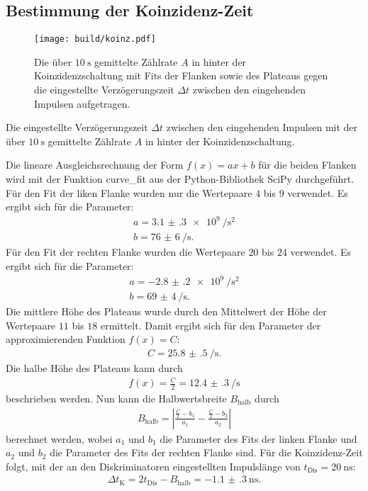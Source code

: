 \subsection{Bestimmung der Koinzidenz-Zeit}
\label{subsec:Koinzidenz}
\begin{figure}
	\centering
	\texttt{[image: build/koinz.pdf]}
	\caption{Die über $\SI{10}{\second}$ gemittelte Zählrate $A$ in hinter der Koinzidenzschaltung mit Fits der Flanken sowie des Plateaus gegen die eingestellte Verzögerungszeit $\varDelta t$ zwischen den eingehenden Impulsen aufgetragen.}
	\label{fig:zweite}
\end{figure}
\begin{table}
	\centering
	\caption{Die eingestellte Verzögerungszeit $\varDelta t$ zwischen den eingehenden Impulsen mit der über $\SI{10}{\second}$ gemittelte Zählrate $A$ in hinter der Koinzidenzschaltung.}
	
\end{table}
Die lineare Ausgleichsrechnung der Form $f(x)=ax +b$ für die beiden Flanken wird mit der Funktion curve\_fit aus der Python-Bibliothek SciPy \cite{scipy} durchgeführt. Für den Fit der liken Flanke wurden nur die Wertepaare $4$ bis $9$ verwendet. Es ergibt sich für die Parameter:
\begin{gather*}
	a=\SI{3.1(3)e9}{\per\second\tothe{2}}\\
	b=\SI{76(6)}{\per\second}.
\end{gather*}
Für den Fit der rechten Flanke wurden die Wertepaare $20$ bis $24$ verwendet. Es ergibt sich für die Parameter:
\begin{gather*}
	a=\SI{-2.8(2)e9}{\per\second\tothe{2}}\\
	b=\SI{69(4)}{\per\second}.
\end{gather*}
Die mittlere Höhe des Plateaus wurde durch den Mittelwert der Höhe der Wertepaare $11$ bis $18$ ermittelt. Damit ergibt sich für den Parameter der approximierenden Funktion $f(x)=C$:
\begin{gather*}
	C=\SI{25.8(5)}{\per\second}.
\end{gather*}
Die halbe Höhe des Plateaus kann durch 
\begin{gather*}
	f(x)=\frac{C}{2}=\SI{12.4(3)}{\per\second}
\end{gather*}
beschrieben werden.
Nun kann die Halbwertsbreite $B_\text{halb}$ durch
\begin{gather*}
	B_\text{halb}=\left|\frac{\frac{C}{2}-b_1}{a_1}-\frac{\frac{C}{2}-b_2}{a_2}\right|
\end{gather*}
berechnet werden, wobei $a_1$ und $b_1$ die Parameter des Fits der linken Flanke und $a_2$ und $b_2$ die Parameter des Fits der rechten Flanke sind.
Für die Koinzidenz-Zeit folgt, mit der an den Diskriminatoren eingestellten Impulslänge von $t_\text{Dis}=\SI{20}{\nano\second}$:
\begin{gather*}
	\Delta t_\text{K}=2 t_\text{Dis}-B_\text{halb}=\SI{-1.1(3)}{\nano\second}.
\end{gather*}

